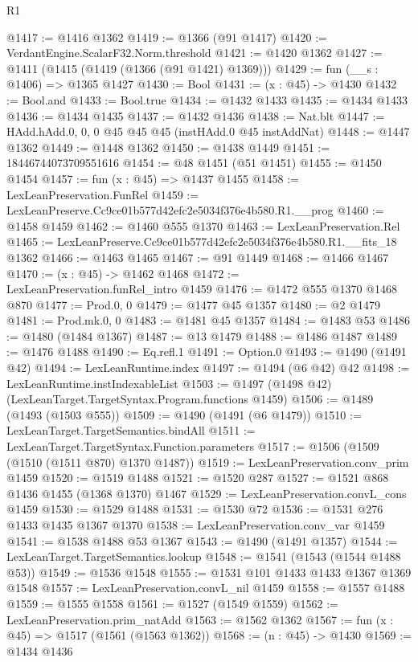 \begin{lexlean}{R1}
\begin{coremodule}
@1417 := @1416 @1362
@1419 := @1366 (@91 @1417)
@1420 := VerdantEngine.ScalarF32.Norm.threshold
@1421 := @1420 @1362
@1427 := @1411 (@1415 (@1419 (@1366 (@91 @1421) @1369)))
@1429 := fun (__s : @1406) => @1365 @1427
@1430 := Bool
@1431 := (x : @45) -> @1430
@1432 := Bool.and
@1433 := Bool.true
@1434 := @1432 @1433
@1435 := @1434 @1433
@1436 := @1434 @1435
@1437 := @1432 @1436
@1438 := Nat.blt
@1447 := HAdd.hAdd.{0, 0, 0} @45 @45 @45 (instHAdd.{0} @45 instAddNat)
@1448 := @1447 @1362
@1449 := @1448 @1362
@1450 := @1438 @1449
@1451 := 18446744073709551616
@1454 := @48 @1451 (@51 @1451)
@1455 := @1450 @1454
@1457 := fun (x : @45) => @1437 @1455
@1458 := LexLeanPreservation.FunRel
@1459 := LexLeanPreserve.Cc9ce01b577d42efc2e5034f376e4b580.R1.__prog
@1460 := @1458 @1459
@1462 := @1460 @555 @1370
@1463 := LexLeanPreservation.Rel
@1465 := LexLeanPreserve.Cc9ce01b577d42efc2e5034f376e4b580.R1.__fits_18 @1362
@1466 := @1463 @1465
@1467 := @91 @1449
@1468 := @1466 @1467
@1470 := (x : @45) -> @1462 @1468
@1472 := LexLeanPreservation.funRel_intro @1459
@1476 := @1472 @555 @1370 @1468 @870
@1477 := Prod.{0, 0}
@1479 := @1477 @45 @1357
@1480 := @2 @1479
@1481 := Prod.mk.{0, 0}
@1483 := @1481 @45 @1357
@1484 := @1483 @53
@1486 := @1480 (@1484 @1367)
@1487 := @13 @1479
@1488 := @1486 @1487
@1489 := @1476 @1488
@1490 := Eq.refl.{1}
@1491 := Option.{0}
@1493 := @1490 (@1491 @42)
@1494 := LexLeanRuntime.index
@1497 := @1494 (@6 @42) @42
@1498 := LexLeanRuntime.instIndexableList
@1503 := @1497 (@1498 @42) (LexLeanTarget.TargetSyntax.Program.functions @1459)
@1506 := @1489 (@1493 (@1503 @555))
@1509 := @1490 (@1491 (@6 @1479))
@1510 := LexLeanTarget.TargetSemantics.bindAll
@1511 := LexLeanTarget.TargetSyntax.Function.parameters
@1517 := @1506 (@1509 (@1510 (@1511 @870) @1370 @1487))
@1519 := LexLeanPreservation.conv_prim @1459
@1520 := @1519 @1488
@1521 := @1520 @287
@1527 := @1521 @868 @1436 @1455 (@1368 @1370) @1467
@1529 := LexLeanPreservation.convL_cons @1459
@1530 := @1529 @1488
@1531 := @1530 @72
@1536 := @1531 @276 @1433 @1435 @1367 @1370
@1538 := LexLeanPreservation.conv_var @1459
@1541 := @1538 @1488 @53 @1367
@1543 := @1490 (@1491 @1357)
@1544 := LexLeanTarget.TargetSemantics.lookup
@1548 := @1541 (@1543 (@1544 @1488 @53))
@1549 := @1536 @1548
@1555 := @1531 @101 @1433 @1433 @1367 @1369 @1548
@1557 := LexLeanPreservation.convL_nil @1459
@1558 := @1557 @1488
@1559 := @1555 @1558
@1561 := @1527 (@1549 @1559)
@1562 := LexLeanPreservation.prim_natAdd
@1563 := @1562 @1362
@1567 := fun (x : @45) => @1517 (@1561 (@1563 @1362))
@1568 := (n : @45) -> @1430
@1569 := @1434 @1436

\end{coremodule}
\end{lexlean}
